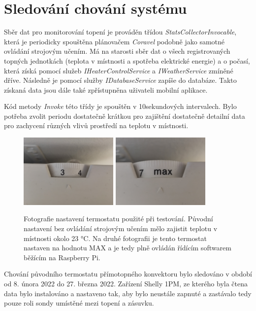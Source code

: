 \pagebreak

\section{Sledování chování systému}
Sběr dat pro monitorování topení je prováděn třídou {\it StatsCollectorInvocable}, která je periodicky spouštěna plánovačem {\it Coravel} podobně jako samotné ovládání strojovým učením. Má na starosti sběr dat o všech registrovaných topných jednotkách (teplota v místnosti a spotřeba elektrické energie) a o počasí, která získá pomocí služeb {\it IHeaterControlService} a {\it IWeatherService} zmíněné dříve. Následně je pomocí služby {\it IDatabaseService} zapíše do databáze. Takto získaná data jsou dále také zpřístupněna uživateli mobilní aplikace.

Kód metody {\it Invoke} této třídy je spouštěn v 10sekundových intervalech. Bylo potřeba zvolit periodu dostatečně krátkou pro zajištění dostatečně detailní data pro zachycení různých vlivů prostředí na teplotu v místnosti.

\begin{figure}[H]
\centering
\includegraphics[width=0.43\textwidth]{obrazky-figures/test-term1.jpg}
\includegraphics[width=0.43\textwidth]{obrazky-figures/test-term2.jpg}
\caption{Fotografie nastavení termostatu použité při testování. Původní nastavení bez ovládání strojovým učením mělo zajistit teplotu v místnosti okolo 23 °C. Na druhé fotografii je tento termostat nastaven na hodnotu MAX a je tedy plně ovládán řídícím softwarem běžícím na Raspberry Pi.}
\end{figure}

Chování původního termostatu přímotopného konvektoru bylo sledováno v období od 8. února 2022 do 27. března 2022. Zařízení Shelly 1PM, ze kterého byla čtena data bylo instalováno a nastaveno tak, aby bylo neustále zapnuté a zastávalo tedy pouze roli sondy umístěné mezi topení a zásuvku.

